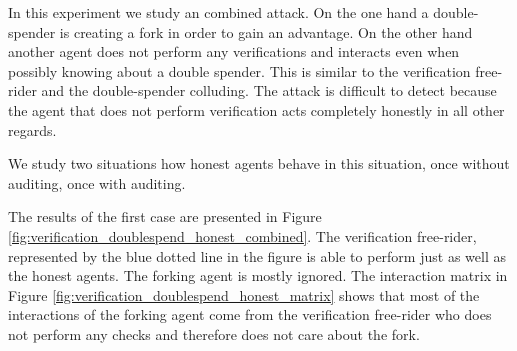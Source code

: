 In this experiment we study an combined attack. On the one hand a double-spender is creating a fork
in order to gain an advantage. On the other hand another agent does not perform any verifications
and interacts even when possibly knowing about a double spender. This is similar to the verification
free-rider and the double-spender colluding. The attack is difficult to detect because the agent
that does not perform verification acts completely honestly in all other regards.

We study two situations how honest agents behave in this situation, once without auditing, once with
auditing.

The results of the first case are presented in Figure \ref{fig:verification_doublespend_honest_combined}. 
The verification free-rider, represented by the blue dotted line in the figure is able to perform 
just as well as the honest agents. The forking agent is mostly ignored. The interaction matrix in 
Figure \ref{fig:verification_doublespend_honest_matrix} shows that most of the interactions of the 
forking agent come from the verification free-rider who does not perform any checks and therefore 
does not care about the fork.

